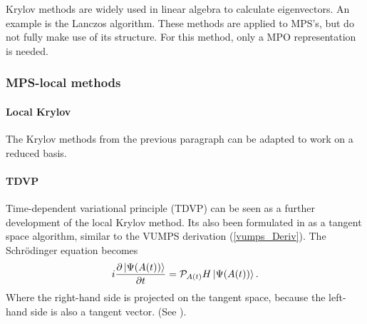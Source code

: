 Krylov methods are widely used in linear algebra to calculate eigenvectors. An example is the Lanczos algorithm. These methods are applied to MPS's, but do not fully make use of its structure. For this method, only a MPO representation is needed.

\subsubsection{MPS-local methods}

\paragraph{Local Krylov}
The Krylov methods from the previous paragraph can be adapted to work on a reduced basis.

\paragraph{TDVP} Time-dependent variational principle (TDVP) can be seen as a further development of the local Krylov method. Its also been formulated in as a tangent space algorithm, similar to the VUMPS derivation (\cref{vumps_Deriv}). The Schrödinger equation becomes
\begin{equation}
    i \frac{\partial \ket{ \Psi( A(t) ) }}{\partial t} = \mathcal{P}_{ A ( t) }  H  \ket{ \Psi( A (t) ) } .
\end{equation}
Where the right-hand side is projected on the tangent space, because the left-hand side is also a tangent vector. (See \cite{Vanderstraeten2019}).

